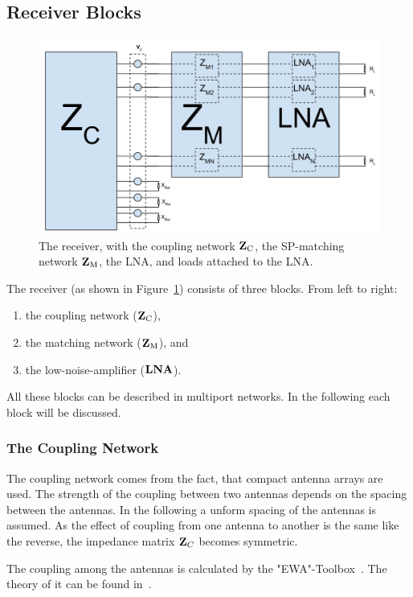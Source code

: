 \subsection{Receiver Blocks}
\begin{figure}[h]
\centering
  \includegraphics[width=0.9\linewidth]{images/Receiver.png}
\caption{The receiver, with the coupling network $\mathbf{Z}_\text{C}$, the SP-matching network $\mathbf{Z}_\text{M}$, the LNA, and loads attached to the LNA.}
\label{fig:receiver}
\end{figure}
The receiver (as shown in Figure~\ref{fig:receiver}) consists of three blocks.
From left to right:
\begin{enumerate}
\item{the coupling network ($\mathbf{Z}_\text{C}$),}
\item{the matching network ($\mathbf{Z}_\text{M}$), and}
\item{the low-noise-amplifier ($\mathbf{LNA}$).}
\end{enumerate}
 
All these blocks can be described in multiport networks.
In the following each block will be discussed.

\subsubsection{The Coupling Network}
\label{sec:coupling_network}
The coupling network comes from the fact, that compact antenna arrays are used.
The strength of the coupling between two antennas depends on the spacing between the antennas.
In the following a unform spacing of the antennas is assumed.
As the effect of coupling from one antenna to another is the same like the reverse, the impedance matrix $\mathbf{Z}_C$ becomes symmetric.

The coupling among the antennas is calculated by the "EWA"-Toolbox~\cite{Orfanidis}.
The theory of it can be found in~\cite[Chapter 23]{Orfanidis}.

